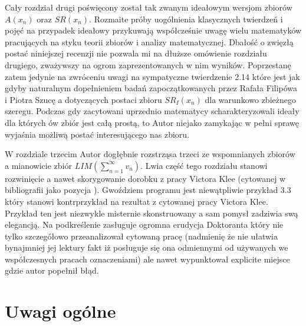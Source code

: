 \documentclass[12pt]{article}
\begin{document}
  Cały rozdział drugi poświęcony został  
tak zwanym ideałowym wersjom zbiorów $A(x_n)$ oraz
$SR(x_n)$. Rozmaite próby uogólnienia klasycznych twierdzeń
i pojęć na przypadek ideałowy przykuwają współcześnie
uwagę wielu matematyków pracujących na styku teorii zbiorów 
i analizy matematycznej. Dbałość o zwięzłą postać niniejszej
recenzji nie pozwala mi na dłuższe omówienie rozdziału drugiego,
zważywszy na ogrom zaprezentowanych w nim wyników. Poprzestanę zatem
jedynie na zwróceniu uwagi na sympatyczne twierdzenie 2.14 które 
jest jak gdyby naturalnym dopełnieniem badań zapoczątkowanych
przez Rafała Filipówa i Piotra Szucę a dotyczących 
postaci zbioru $SR_I(x_n)$ dla warunkowo zbieżnego szeregu.
Podczas gdy zacytowani uprzednio matematycy scharakteryzowali
ideały dla których ów zbiór jest całą prostą, to
Autor niejako zamykając w pełni sprawę wyjaśnia możliwą
postać interesującego nas zbioru.
  
  W rozdziale trzecim Autor dogłębnie rozstrząsa 
trzeci ze wspomnianych zbiorów a mianowicie
zbiór $LIM(\sum_{n=1}^\infty v_n)$. Lwia część 
tego rozdziału stanowi rozwinięcie a nawet
skorygowanie dorobku z pracy Victora Klee
(cytowanej w bibliografii jako pozycja \big[28\big]).
Gwoździem programu jest niewątpliwie przykład
3.3 który stanowi kontrprzykład na rezultat
z cytowanej pracy Victora Klee. Przykład ten
jest niezwykle misternie skonstruowany a
sam pomysł zadziwia swą elegancją. Na podkreślenie zasługuje 
ogromna erudycja Doktoranta który nie tylko
szczegółowo przeanalizował cytowaną
pracę (nadmienię że nie ułatwia bynajmniej jej lektury fakt
iż posługuje się ona odmiennymi od 
używanych we współczesnych pracach oznaczeniami)
ale nawet wypunktował explicite miejsce gdzie autor 
popełnił błąd.

\section{Uwagi ogólne}
\end{document}
